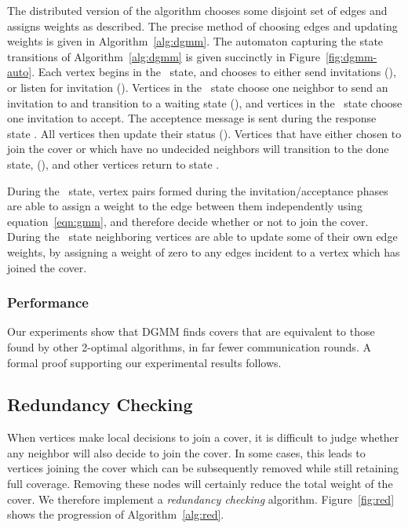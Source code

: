 

The distributed version of the algorithm chooses some disjoint set of edges and assigns weights as described. The precise method of choosing edges and updating weights is given in Algorithm~\ref{alg:dgmm}. The automaton capturing the state transitions of Algorithm~\ref{alg:dgmm} is given succinctly in Figure~\ref{fig:dgmm-auto}. Each vertex begins in the \cCd\ state, and chooses to either send invitations (\cId), or listen for invitation (\cLd). Vertices in the \cId\ state choose one neighbor to send an invitation to and transition to a waiting state (\cWd), and vertices in the \cLd\ state choose one invitation to accept. The acceptence message is sent during the response state \cRd. All vertices then update their status (\cUd). Vertices that have either chosen to join the cover or which have no undecided neighbors will transition to the done state, (\cDd), and other vertices return to state \cCd.  



During the \cUd\ state, vertex pairs formed during the invitation/acceptance phases are able to assign a weight to the edge between them independently using equation~\ref{eqn:gmm}, and therefore decide whether or not to join the cover. During the \cEd\ state neighboring vertices are able to update some of their own edge weights, by assigning a weight of zero to any edges incident to a vertex which has joined the cover.



\subsubsection{Performance}

Our experiments show that DGMM finds covers that are equivalent to those found by other 2-optimal algorithms, in far fewer communication rounds. A formal proof supporting our experimental results follows.




\subsection{Redundancy Checking}
\label{sec:redundant}
When vertices make local decisions to join a cover, it is difficult to judge whether any neighbor will also decide to join the cover. In some cases, this leads to vertices joining the cover which can be subsequently removed while still retaining full coverage. Removing these nodes will certainly reduce the total weight of the cover. We therefore implement a {\em redundancy checking} algorithm. Figure~\ref{fig:red} shows the progression of Algorithm~\ref{alg:red}.

